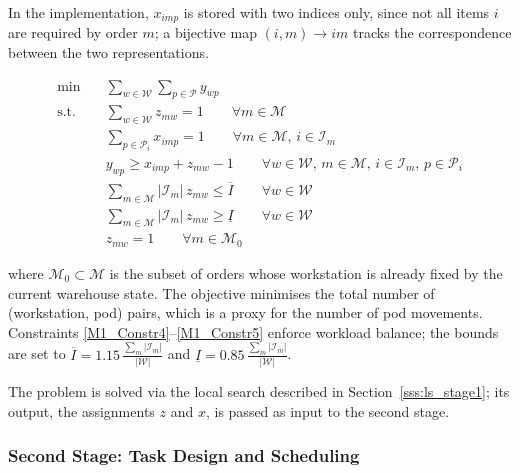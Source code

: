 \documentclass[a4paper,10pt]{article}
\begin{document}
In the implementation, $x_{imp}$ is stored with two indices only, since not all items $i$ are required by order $m$; a bijective map $(i,m)\to im$ tracks the correspondence between the two representations.

\begin{align}
    \min \quad
    & \sum_{w \in \mathcal{W}}\sum_{p \in \mathcal{P}} y_{wp} \\[4pt]
    \text{s.t.} \quad
    & \sum_{w \in \mathcal{W}} z_{mw} = 1
      \qquad \forall m \in \mathcal{M} \label{M1_Constr1} \\
    & \sum_{p \in \mathcal{P}_i} x_{imp} = 1
      \qquad \forall m \in \mathcal{M},\, i \in \mathcal{I}_m \label{M1_Constr2} \\
    & y_{wp} \ge x_{imp} + z_{mw} - 1
      \qquad \forall w \in \mathcal{W},\, m \in \mathcal{M},\,
              i \in \mathcal{I}_m,\, p \in \mathcal{P}_i \label{M1_Constr3} \\
    & \sum_{m \in \mathcal{M}} |\mathcal{I}_m|\, z_{mw} \le \overline{I}
      \qquad \forall w \in \mathcal{W} \label{M1_Constr4} \\
    & \sum_{m \in \mathcal{M}} |\mathcal{I}_m|\, z_{mw} \ge \underline{I}
      \qquad \forall w \in \mathcal{W} \label{M1_Constr5} \\
    & z_{mw} = 1
      \qquad \forall m \in \mathcal{M}_0 \label{M1_InitialCond}
\end{align}

where $\mathcal{M}_0 \subset \mathcal{M}$ is the subset of orders whose workstation is already fixed by the current warehouse state. The objective minimises the total number of (workstation, pod) pairs, which is a proxy for the number of pod movements. Constraints \eqref{M1_Constr4}--\eqref{M1_Constr5} enforce workload balance; the bounds are set to $\overline{I} = 1.15\,\frac{\sum_m |\mathcal{I}_m|}{|\mathcal{W}|}$ and $\underline{I} = 0.85\,\frac{\sum_m |\mathcal{I}_m|}{|\mathcal{W}|}$.

The problem is solved via the local search described in Section~\ref{sss:ls_stage1}; its output, the assignments $z$ and $x$, is passed as input to the second stage.


\subsubsection{Second Stage: Task Design and Scheduling}
\end{document}
